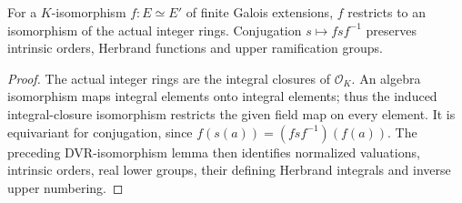 \begin{lemma}
\label{fw:ramification-field-equiv}
\leanok
For a $K$-isomorphism $f:E\simeq E'$ of finite Galois extensions,
$f$ restricts to an isomorphism of the actual integer rings. Conjugation
$s\mapsto f s f^{-1}$ preserves intrinsic orders, Herbrand functions
and upper ramification groups.
\end{lemma}
\begin{proof}
The actual integer rings are the integral closures of $\mathcal O_K$.
An algebra isomorphism maps integral elements onto integral elements;
thus the induced integral-closure isomorphism restricts the given field
map on every element. It is equivariant for conjugation, since
$f(s(a))=(f s f^{-1})(f(a))$. The preceding DVR-isomorphism lemma
then identifies normalized valuations, intrinsic orders, real lower
groups, their defining Herbrand integrals and inverse upper numbering.
\end{proof}

